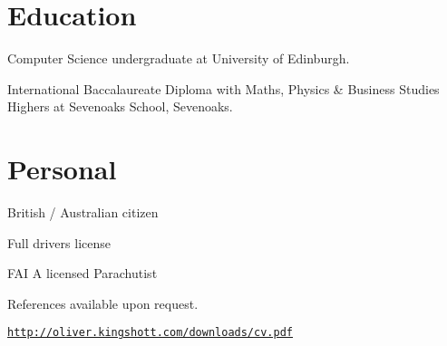 \documentclass[a4paper]{article}
\def\footerlink{http://oliver.kingshott.com/downloads/cv.pdf}
\renewenvironment{itemize}{
  \begin{list}{}{
    \setlength{\leftmargin}{1.5em}
  }
}{
  \end{list}
}
\begin{document}
\section*{Education}
\begin{itemize}
  \item Computer Science undergraduate at University of Edinburgh.
  \item International Baccalaureate Diploma with Maths, Physics \& Business Studies Highers at Sevenoaks School, Sevenoaks.
\end{itemize}

\section*{Personal}

\begin{itemize}
\item British / Australian citizen
\item Full drivers license
\item FAI A licensed Parachutist
\item References available upon request.
\end{itemize}

\bigskip

\begin{center}
  \begin{footnotesize}
    \href{\footerlink}{\texttt{\footerlink}}
  \end{footnotesize}
\end{center}
\end{document}
